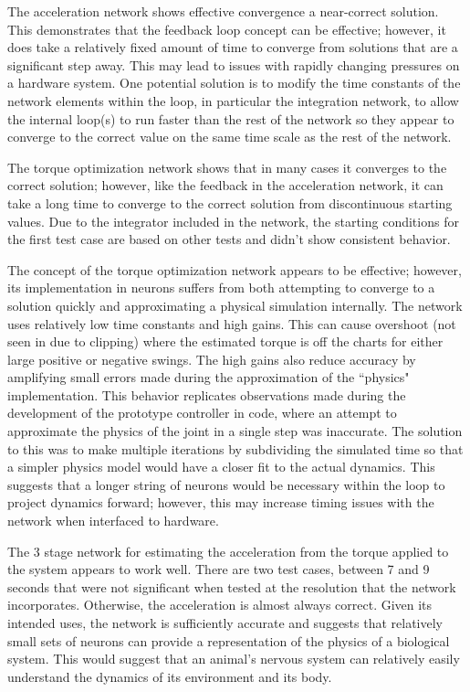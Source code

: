 
The acceleration network shows effective convergence a near-correct solution.
This demonstrates that the feedback loop concept can be effective; however, it
does take a relatively fixed amount of time to
converge from solutions that are a significant step away. This may lead to
issues with rapidly changing pressures on a hardware system. One potential
solution is to modify the time constants of the network
elements within the loop, in particular the integration network, to allow the
internal loop(s) to run faster than the rest of the network
so they appear to converge to the correct value on the same time scale as the
rest of the network.


The torque optimization network shows that in many cases it converges to the
correct solution; however, like the feedback in the acceleration network, it can
take a long time to converge to the correct solution from discontinuous starting
values. Due to the integrator included in the network, the starting conditions
for the first test case are based on other tests and didn't show consistent
behavior.

The concept of the torque optimization network appears to be effective; however,
its implementation in neurons suffers from both attempting to converge to a
solution quickly and approximating a physical simulation internally. The network
uses relatively low time constants and high gains. This can cause overshoot
(not seen in  due to clipping) where the
estimated torque is off the charts for either large positive or negative swings.
The high gains also reduce accuracy by amplifying small errors made during the
approximation of the ``physics" implementation. This behavior replicates
observations made during the development of the prototype controller in code,
where an attempt to approximate the physics of the joint in a single step was
inaccurate. The solution to this was to make multiple iterations by subdividing
the simulated time so that a simpler physics model would have a closer fit to
the actual dynamics. This suggests that a longer string of neurons would be
necessary within the loop to project dynamics forward; however, this may
increase timing issues with the network when interfaced to hardware.


The 3 stage network for estimating the acceleration from the torque applied to
the system appears to work well. There are two test cases, between 7 and 9
seconds that were not significant when tested at the resolution that the
network incorporates. Otherwise, the acceleration is almost always correct.
Given its intended uses, the network is sufficiently accurate and suggests that
relatively small sets of neurons can provide a representation of the physics of
a biological system. This would suggest that an animal's nervous system can
relatively easily understand the dynamics of its environment and its body.

